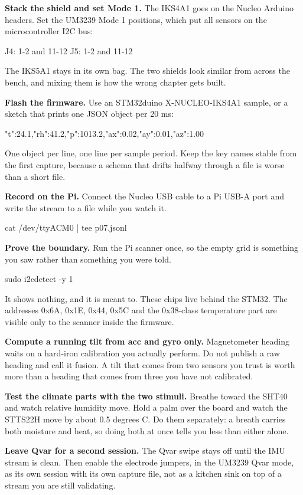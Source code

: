 \begin{steps}
\item \textbf{Stack the shield and set Mode 1.} The IKS4A1 goes on the Nucleo Arduino
headers. Set the UM3239 Mode 1 positions, which put all sensors on the microcontroller I2C
bus:
\begin{plaincode}
J4: 1-2 and 11-12
J5: 1-2 and 11-12
\end{plaincode}
The IKS5A1 stays in its own bag. The two shields look similar from across the bench, and
mixing them is how the wrong chapter gets built.

\item \textbf{Flash the firmware.} Use an STM32duino X-NUCLEO-IKS4A1 sample, or a sketch
that prints one JSON object per 20 ms:
\begin{plaincode}
{"t":24.1,"rh":41.2,"p":1013.2,"ax":0.02,"ay":0.01,"az":1.00}
\end{plaincode}
One object per line, one line per sample period. Keep the key names stable from the first
capture, because a schema that drifts halfway through a file is worse than a short file.

\item \textbf{Record on the Pi.} Connect the Nucleo USB cable to a Pi USB-A port and write
the stream to a file while you watch it.
\begin{shellcode}
cat /dev/ttyACM0 | tee p07.jsonl
\end{shellcode}

\item \textbf{Prove the boundary.} Run the Pi scanner once, so the empty grid is something
you saw rather than something you were told.
\begin{shellcode}
sudo i2cdetect -y 1
\end{shellcode}
It shows nothing, and it is meant to. These chips live behind the STM32. The addresses
0x6A, 0x1E, 0x44, 0x5C and the 0x38-class temperature part are visible only to the scanner
inside the firmware.

\item \textbf{Compute a running tilt from acc and gyro only.} Magnetometer heading waits on
a hard-iron calibration you actually perform. Do not publish a raw heading and call it
fusion. A tilt that comes from two sensors you trust is worth more than a heading that
comes from three you have not calibrated.

\item \textbf{Test the climate parts with the two stimuli.} Breathe toward the SHT40 and
watch relative humidity move. Hold a palm over the board and watch the STTS22H move by
about 0.5 degrees C. Do them separately: a breath carries both moisture and heat, so doing
both at once tells you less than either alone.

\item \textbf{Leave Qvar for a second session.} The Qvar swipe stays off until the IMU
stream is clean. Then enable the electrode jumpers, in the UM3239 Qvar mode, as its own
session with its own capture file, not as a kitchen sink on top of a stream you are still
validating.
\end{steps}

